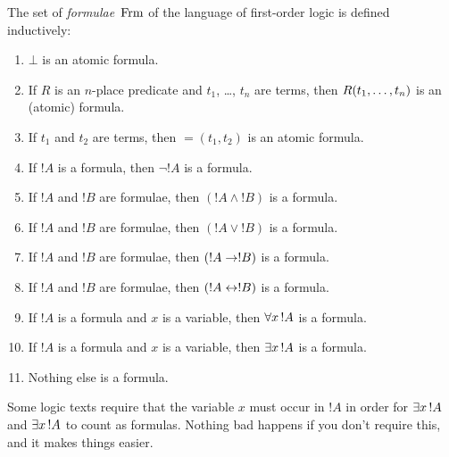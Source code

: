 \documentclass[syntax-and-semantics]{subfiles}
\begin{document}
\begin{defn}[Formula]
The set of \emph{formulae}~$\Frm$ of the language of first-order logic
is defined inductively:
\begin{enumerate}
\item $\bot$ is an atomic formula.
\item If $R$ is an $n$-place predicate and $t_1$, \dots, $t_n$ are
  terms, then ${ R(t_1,\ldots, t_n) }$ is an (atomic) formula.
\item If $t_1$ and $t_2$ are terms, then $=(t_1, t_2)$ is an atomic formula.
\item If $!A$ is a formula, then $\lnot !A$ is a formula.
\item If $!A$ and $!B$ are formulae, then $(!A \land !B)$ is a formula.
\item If $!A$ and $!B$ are formulae, then $(!A \lor !B)$ is a formula.
\item If $!A$ and $!B$ are formulae, then $(!A \to !B)$ is a formula.
\item If $!A$ and $!B$ are formulae, then $(!A \leftrightarrow !B)$ is a formula.
\item If $!A$ is a formula and $x$ is a variable, then $\lforall[x]\,
  !A$ is a formula.
\item If $!A$ is a formula and $x$ is a variable, then $\lexists[x]\,
  !A$ is a formula.
\item Nothing else is a formula.
\end{enumerate}
\end{defn}


Some logic texts require that the variable $x$ must occur in $!A$ in
order for $\lexists x\, !A$ and $\lexists x\, !A$ to count as
formulas.  Nothing bad happens if you don't require this, and it makes
things easier.
\end{document}
